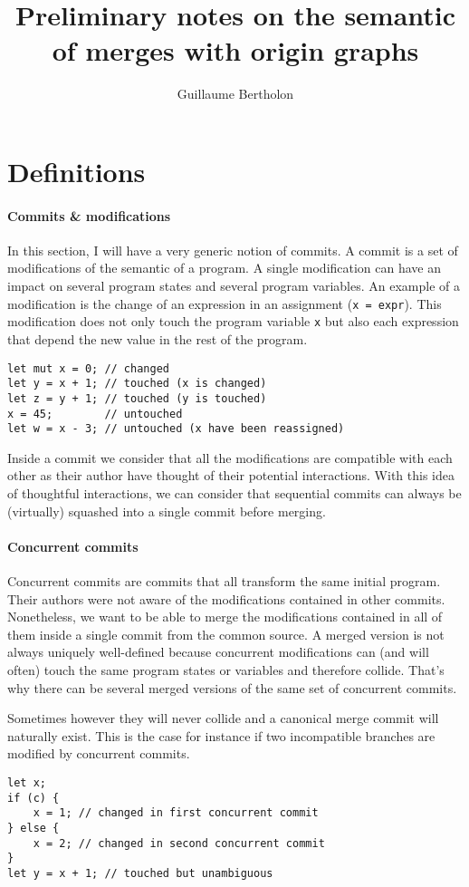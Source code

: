 \documentclass[a4paper,10pt]{article}
\title{Preliminary notes on the semantic of merges with origin graphs}
\author{Guillaume Bertholon}
\begin{document}
\maketitle

\section{Definitions}

\paragraph{Commits \& modifications}
In this section, I will have a very generic notion of commits. A commit is a set of modifications of the semantic of a program. A single modification
can have an impact on several program states and several program variables.
An example of a modification is the change of an expression in an assignment (\lstinline{x = expr}). This modification does not only touch the program variable \lstinline{x} but also each expression that depend the new value in the rest of the program.
\begin{lstlisting}[caption=Modification of $x$]
let mut x = 0; // changed
let y = x + 1; // touched (x is changed)
let z = y + 1; // touched (y is touched)
x = 45;        // untouched
let w = x - 3; // untouched (x have been reassigned)
\end{lstlisting}
Inside a commit we consider that all the modifications are compatible with each
other as their author have thought of their potential interactions.
With this idea of thoughtful interactions, we can consider that sequential commits can always be (virtually) squashed into a single commit before merging.

\paragraph{Concurrent commits}
Concurrent commits are commits that all transform the same initial program. Their authors were not aware of the modifications contained in other commits. Nonetheless, we want to be able to merge the modifications contained in all of them inside a single commit from the common source. A merged version is not always uniquely well-defined because concurrent modifications can (and will often) touch the same program states or variables and therefore collide. That's why there can be several merged versions of the same set of concurrent commits.

Sometimes however they will never collide and a canonical merge commit will naturally exist. This is the case for instance if two incompatible branches are modified by concurrent commits.
\begin{lstlisting}[caption=Merged version of two compatible concurrent commits modifying $x$]
let x;
if (c) {
    x = 1; // changed in first concurrent commit
} else {
    x = 2; // changed in second concurrent commit
}
let y = x + 1; // touched but unambiguous
\end{lstlisting}
\end{document}
